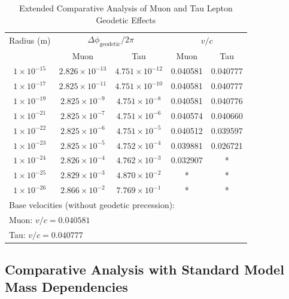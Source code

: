 \documentclass[%
 reprint,
 amsmath,amssymb,
 aps,
]{revtex4-1}
\numberwithin{equation}{section}%
\begin{document}
\begin{table}[t!]
    \renewcommand\arraystretch{1.3}
    \caption{Extended Comparative Analysis of Muon and Tau Lepton Geodetic Effects}
    \begin{tabular}{ccccc}
    \hline
    Radius (m) & \multicolumn{2}{c}{$\Delta \phi_{\text{geodetic}}/2\pi$} & \multicolumn{2}{c}{$v/c$} \\
    & Muon & Tau & Muon & Tau \\
    \hline
    $1 \times 10^{-15}$ & $2.826 \times 10^{-13}$ & $4.751 \times 10^{-12}$ & 0.040581 & 0.040777 \\
    $1 \times 10^{-17}$ & $2.825 \times 10^{-11}$ & $4.751 \times 10^{-10}$ & 0.040581 & 0.040777 \\
    $1 \times 10^{-19}$ & $2.825 \times 10^{-9}$ & $4.751 \times 10^{-8}$ & 0.040581 & 0.040776 \\
    $1 \times 10^{-21}$ & $2.825 \times 10^{-7}$ & $4.751 \times 10^{-6}$ & 0.040574 & 0.040660 \\
    $1 \times 10^{-22}$ & $2.825 \times 10^{-6}$ & $4.751 \times 10^{-5}$ & 0.040512 & 0.039597 \\
    $1 \times 10^{-23}$ & $2.825 \times 10^{-5}$ & $4.752 \times 10^{-4}$ & 0.039881 & 0.026721 \\
    $1 \times 10^{-24}$ & $2.826 \times 10^{-4}$ & $4.762 \times 10^{-3}$ & 0.032907 & * \\
    $1 \times 10^{-25}$ & $2.829 \times 10^{-3}$ & $4.870 \times 10^{-2}$ & * & * \\
    $1 \times 10^{-26}$ & $2.866 \times 10^{-2}$ & $7.769 \times 10^{-1}$ & * & * \\
    \hline
    \multicolumn{5}{l}{Base velocities (without geodetic precession):} \\
    \multicolumn{5}{l}{Muon: $v/c = 0.040581$} \\
    \multicolumn{5}{l}{Tau: $v/c = 0.040777$} \\
    \hline
    \end{tabular}
    \label{table:extended_comparative_muon_tau}
\end{table}


\subsection{Comparative Analysis with Standard Model Mass Dependencies}
\label{sec:ComparativeAnalysisWith}
\end{document}
